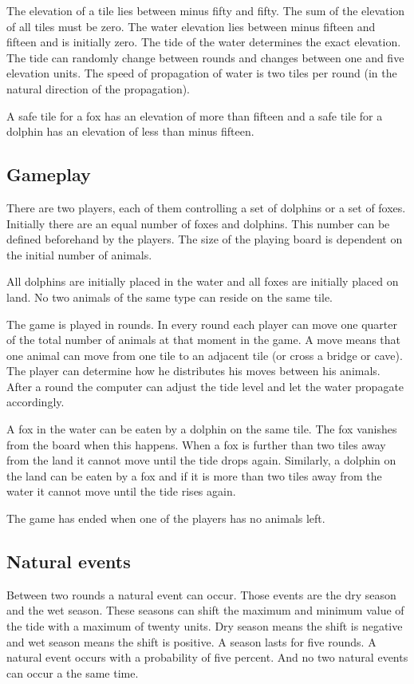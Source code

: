 \documentclass[12pt]{article}
\begin{document}
The elevation of a tile lies between minus fifty and fifty. The sum of the elevation of all tiles must be zero. The water elevation lies between minus fifteen and fifteen and is initially zero. The tide of the water determines the exact elevation. The tide can randomly change between rounds and changes between one and five elevation units. The speed of propagation of water is two tiles per round (in the natural direction of the propagation).

A safe tile for a fox has an elevation of more than fifteen and a safe tile for a dolphin has an elevation of less than minus fifteen.

\subsection{Gameplay}
There are two players, each of them controlling a set of dolphins or a set of foxes. Initially there are an equal number of foxes and dolphins. This number can be defined beforehand by the players. The size of the playing board is dependent on the initial number of animals.

All dolphins are initially placed in the water and all foxes are initially placed on land. No two animals of the same type can reside on the same tile.

The game is played in rounds. In every round each player can move one quarter of the total number of animals at that moment in the game. A move means that one animal can move from one tile to an adjacent tile (or cross a bridge or cave). The player can determine how he distributes his moves between his animals. After a round the computer can adjust the tide level and let the water propagate accordingly.

A fox in the water can be eaten by a dolphin on the same tile. The fox vanishes from the board when this happens. When a fox is further than two tiles away from the land it cannot move until the tide drops again. Similarly, a dolphin on the land can be eaten by a fox and if it is more than two tiles away from the water it cannot move until the tide rises again.

The game has ended when one of the players has no animals left.

\subsection{Natural events}
Between two rounds a natural event can occur. Those events are the dry season and the wet season. These seasons can shift the maximum and minimum value of the tide with a maximum of twenty units. Dry season means the shift is negative and wet season means the shift is positive. A season lasts for five rounds. A natural event occurs with a probability of five percent. And no two natural events can occur a the same time.
\end{document}
